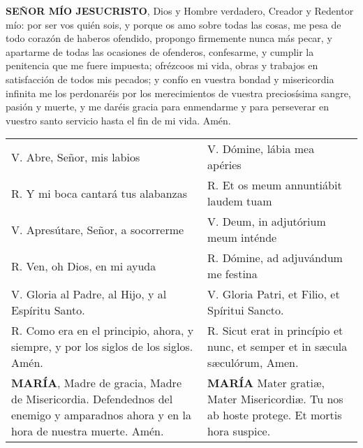 \documentclass[./rosary.tex]{subfiles}
\begin{document}
\label{contrition}
\textbf{SEÑOR MÍO JESUCRISTO}, Dios y Hombre verdadero, Creador y Redentor mío: por ser vos quién sois, y porque os amo sobre todas las cosas,
me pesa de todo corazón de haberos ofendido, propongo firmemente nunca más pecar, y apartarme de todas las ocasiones de ofenderos,
confesarme, y cumplir la penitencia que me fuere impuesta; ofrézcoos mi vida, obras y trabajos en satisfacción de todos mis pecados;
y confío en vuestra bondad y misericordia infinita me los perdonaréis por los merecimientos de vuestra preciosísima sangre, pasión y muerte,
y me daréis gracia para enmendarme y para perseverar en vuestro santo servicio hasta el fin de mi vida. Amén.

\begin{longtable} {p{} p{} }
    V. Abre, Señor, mis labios                                                           & V. Dómine, lábia mea apéries                                                \\
    R. Y mi boca cantará tus alabanzas                                                   & R. Et os meum annuntiábit laudem tuam                                       \\
    V. Apresútare, Señor, a socorrerme                                                   & V. Deum, in adjutórium meum inténde                                         \\
    R. Ven, oh Dios, en mi ayuda                                                         & R. Dómine, ad adjuvándum me festina                                         \\
    V. Gloria al Padre, al Hijo, y al Espíritu Santo.\label{sec:glory}                   & V. Gloria Patri, et Filio, et Spíritui Sancto.                              \\
    R. Como era en el principio, ahora, y siempre, y por los siglos de los siglos. Amén. & R. Sicut erat in princípio et nunc, et semper et in sæcula sæculórum, Amen. \\
    \textbf{MARÍA}, Madre de gracia, Madre de Misericordia. Defendednos del enemigo y amparadnos ahora y en la hora de nuestra muerte. Amén.                               
    
     & 
    
    \textbf{MARÍA} Mater gratiæ, Mater Misericordiæ. Tu nos ab hoste protege. Et mortis hora suspice.

\end{longtable}
\end{document}
